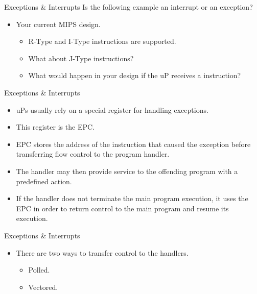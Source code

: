 % 
\begin{frame}{Exceptions \& Interrupts}{}
Is the following example an interrupt or an exception?
\begin{itemize}
\item Your current \ac{MIPS} design.
  \begin{itemize}
  \item R-Type and I-Type instructions are supported.
  \pauseprint
  \item What about J-Type instructions?
  \item What would happen in your design if the \ac{uP} receives a  instruction?
  \end{itemize}
\end{itemize}
\end{frame} 

% 
\begin{frame}{Exceptions \& Interrupts}{}
\begin{itemize}
\item \acp{uP} usually rely on a special register for handling exceptions.
\item This register is the \ac{EPC}.
\item \ac{EPC} stores the address of the instruction that caused the exception before transferring flow control to the program handler.
\item The handler may then provide service to the offending program with a predefined action.
\item If the handler does not terminate the main program execution, it uses the \ac{EPC} in order to return control to the main program and resume its execution.
\end{itemize}
\end{frame}

% 
\begin{frame}{Exceptions \& Interrupts}{}
\begin{itemize}
\item There are two ways to transfer control to the handlers.
  \begin{itemize}
  \item Polled.
  \item Vectored.
  \end{itemize}
\end{itemize}
\end{frame}

